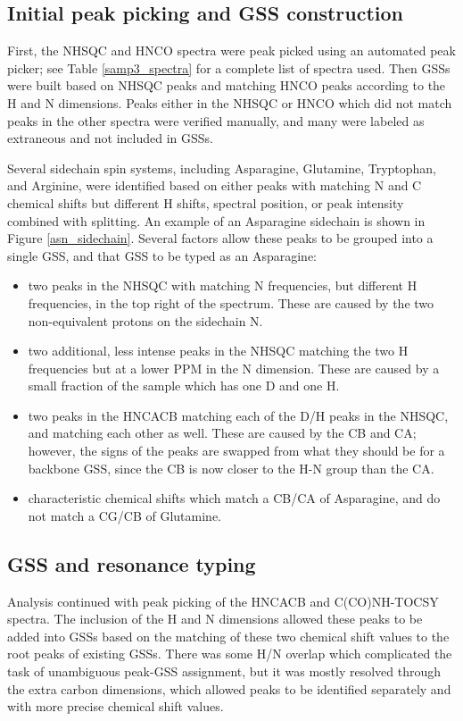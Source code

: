 \subsection*{Initial peak picking and GSS construction}
First, the NHSQC and HNCO spectra were peak picked using an automated 
peak picker; see Table \ref{samp3_spectra} for a complete list of spectra
used.  Then GSSs were built based on NHSQC peaks and matching HNCO peaks
according to the H and N dimensions.  Peaks either in the NHSQC or HNCO
which did not match peaks in the other spectra were verified manually, and
many were labeled as extraneous and not included in GSSs.

Several sidechain spin systems, including Asparagine, Glutamine, Tryptophan,
and Arginine, were identified based on either peaks with matching N and C
chemical shifts but different H shifts, spectral position, or peak intensity
combined with splitting.  An example of an Asparagine sidechain is shown in
Figure \ref{asn_sidechain}.  Several factors allow these peaks to be grouped
into a single GSS, and that GSS to be typed as an Asparagine:
\begin{itemize}
  \item two peaks in the NHSQC with matching N frequencies, but different H
    frequencies, in the top right of the spectrum.  These are caused by the
    two non-equivalent protons on the sidechain N.
  \item two additional, less intense peaks in the NHSQC matching the two
    H frequencies but at a lower PPM in the N dimension.  These are caused by
    a small fraction of the sample which has one D and one H.
  \item two peaks in the HNCACB matching each of the D/H peaks in the NHSQC,
    and matching each other as well.  These are caused by the CB and CA; 
    however, the signs of the peaks are swapped from what they should be for
    a backbone GSS, since the CB is now closer to the H-N group than the CA.
  \item characteristic chemical shifts which match a CB/CA of Asparagine, 
    and do not match a CG/CB of Glutamine.
\end{itemize}

\subsection*{GSS and resonance typing}
Analysis continued with peak picking of the HNCACB and C(CO)NH-TOCSY spectra.
The inclusion of the H and N dimensions allowed these peaks to be added into
GSSs based on the matching of these two chemical shift values to the
root peaks of existing GSSs.  There was some H/N overlap which complicated the
task of unambiguous peak-GSS assignment, but it was mostly resolved through
the extra carbon dimensions, which allowed peaks to be identified separately
and with more precise chemical shift values.

